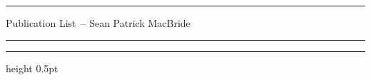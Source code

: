 \documentclass[11pt]{article}
\newcommand{\yourname}{Sean Patrick MacBride}
\newcommand{\soptitle}{Publication List}
\begin{document}
\thispagestyle{plain}
\hrule
\begin{center}
    \Large\soptitle\ -- \yourname
\end{center}
\vspace{0pt}
\hrule
\vspace{0.5pt}
\hrule height 0.5pt
\vspace{3pt}

\nocite{*}

\end{document}
